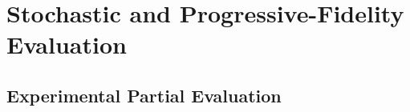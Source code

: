 
\section{Stochastic and Progressive-Fidelity Evaluation}
\subsection{Experimental Partial Evaluation}


